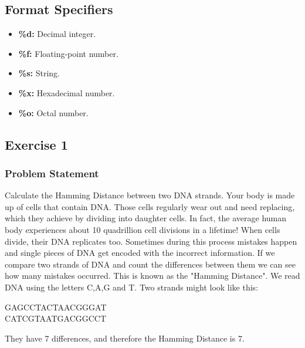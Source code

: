 \documentclass{report}
\begin{document}
    \bigbreak \noindent 
    \subsection{Format Specifiers}
    \begin{itemize}
        \item \textbf{\%d:} Decimal integer.
        \item \textbf{\%f:} Floating-point number.
        \item \textbf{\%s:} String.
        \item \textbf{\%x:} Hexadecimal number.
        \item \textbf{\%o:} Octal number.
    \end{itemize}




















    

    \pagebreak 
    \bigbreak \noindent 
    \subsection{Exercise 1}
    \bigbreak \noindent 
    \subsubsection{Problem Statement}
    \bigbreak \noindent 
    Calculate the Hamming Distance between two DNA strands.
    \bigbreak \noindent 
    Your body is made up of cells that contain DNA. Those cells regularly wear out and need replacing, which they achieve by dividing into daughter cells. In fact, the average human body experiences about 10 quadrillion cell divisions in a lifetime!
    \bigbreak \noindent 
    When cells divide, their DNA replicates too. Sometimes during this process mistakes happen and single pieces of DNA get encoded with the incorrect information. If we compare two strands of DNA and count the differences between them we can see how many mistakes occurred. This is known as the "Hamming Distance".
    \bigbreak \noindent 
    We read DNA using the letters C,A,G and T. Two strands might look like this:
    \bigbreak \noindent 
    \begin{center}
        GAGCCTACTAACGGGAT \\
        CATCGTAATGACGGCCT \\
    \end{center}
    They have 7 differences, and therefore the Hamming Distance is 7.
    \bigbreak \noindent 
\end{document}
